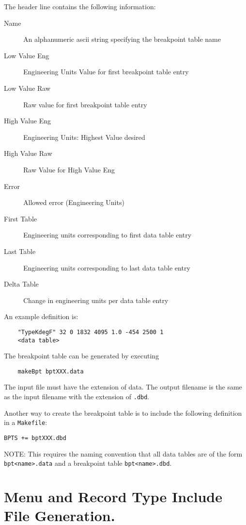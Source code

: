 The header line contains the following information:

\begin{description}
\item [Name] An alphanumeric ascii string specifying the breakpoint table name
\item [Low Value Eng] Engineering Units Value for first breakpoint table entry
\item [Low Value Raw] Raw value for first breakpoint table entry
\item [High Value Eng] Engineering Units: Highest Value desired
\item [High Value Raw] Raw Value for High Value Eng
\item [Error] Allowed error (Engineering Units)
\item [First Table] Engineering units corresponding to first data table entry
\item [Last Table] Engineering units corresponding to last data table entry
\item [Delta Table] Change in engineering units per data table entry
\end{description}

 An example definition is:

\begin{verbatim}
    "TypeKdegF" 32 0 1832 4095 1.0 -454 2500 1
    <data table>
\end{verbatim}

The breakpoint table can be generated by executing

\begin{verbatim}
    makeBpt bptXXX.data
\end{verbatim}

The input file must have the extension of data.
The output filename is the same as the input filename with the extension of \verb|.dbd|.

Another way to create the breakpoint table is to include the following definition in a \verb|Makefile|:

\begin{verbatim}
BPTS += bptXXX.dbd
\end{verbatim}

NOTE: This requires the naming convention that all data tables are of the form \verb|bpt<name>.data| and a breakpoint table \verb|bpt<name>.dbd|.

\section{Menu and Record Type Include File Generation.}

